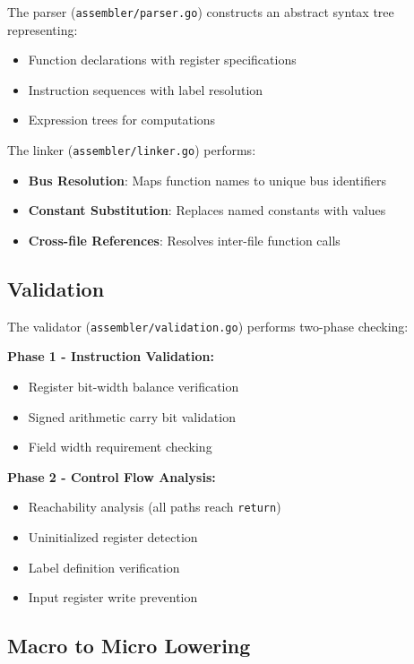 \documentclass[11pt,a4paper]{article}
\begin{document}
The parser (\texttt{assembler/parser.go}) constructs an abstract syntax tree representing:

\begin{itemize}
    \item Function declarations with register specifications
    \item Instruction sequences with label resolution
    \item Expression trees for computations
\end{itemize}

The linker (\texttt{assembler/linker.go}) performs:

\begin{itemize}
    \item \textbf{Bus Resolution}: Maps function names to unique bus identifiers
    \item \textbf{Constant Substitution}: Replaces named constants with values
    \item \textbf{Cross-file References}: Resolves inter-file function calls
\end{itemize}

\subsection{Validation}

The validator (\texttt{assembler/validation.go}) performs two-phase checking:

\textbf{Phase 1 - Instruction Validation:}
\begin{itemize}
    \item Register bit-width balance verification
    \item Signed arithmetic carry bit validation
    \item Field width requirement checking
\end{itemize}

\textbf{Phase 2 - Control Flow Analysis:}
\begin{itemize}
    \item Reachability analysis (all paths reach \texttt{return})
    \item Uninitialized register detection
    \item Label definition verification
    \item Input register write prevention
\end{itemize}

\subsection{Macro to Micro Lowering}
\end{document}
